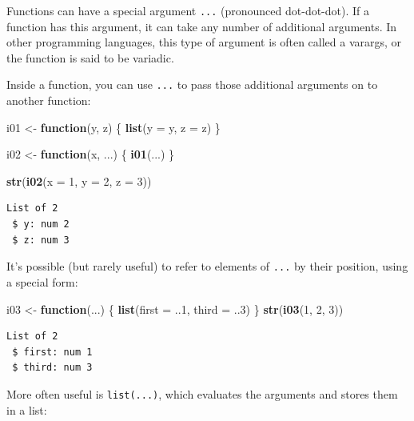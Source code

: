 \documentclass[]{book}
\newenvironment{Shaded}{\begin{snugshade}}{\end{snugshade}}
\newcommand{\ControlFlowTok}[1]{\textcolor[rgb]{0.13,0.29,0.53}{\textbf{#1}}}
\newcommand{\DataTypeTok}[1]{\textcolor[rgb]{0.13,0.29,0.53}{#1}}
\newcommand{\DecValTok}[1]{\textcolor[rgb]{0.00,0.00,0.81}{#1}}
\newcommand{\KeywordTok}[1]{\textcolor[rgb]{0.13,0.29,0.53}{\textbf{#1}}}
\newcommand{\NormalTok}[1]{#1}
\newcommand{\StringTok}[1]{\textcolor[rgb]{0.31,0.60,0.02}{#1}}
\theoremstyle{definition}
\theoremstyle{definition}
\theoremstyle{definition}
\theoremstyle{remark}
\begin{document}
Functions can have a special argument \texttt{...} (pronounced
dot-dot-dot). If a function has this argument, it can take any number of
additional arguments. In other programming languages, this type of
argument is often called a varargs, or the function is said to be
variadic.

Inside a function, you can use \texttt{...} to pass those additional
arguments on to another function:

\begin{Shaded}
\begin{Highlighting}[]
\NormalTok{i01 <-}\StringTok{ }\ControlFlowTok{function}\NormalTok{(y, z) \{}
  \KeywordTok{list}\NormalTok{(}\DataTypeTok{y =}\NormalTok{ y, }\DataTypeTok{z =}\NormalTok{ z)}
\NormalTok{\}}

\NormalTok{i02 <-}\StringTok{ }\ControlFlowTok{function}\NormalTok{(x, ...) \{}
  \KeywordTok{i01}\NormalTok{(...)}
\NormalTok{\}}

\KeywordTok{str}\NormalTok{(}\KeywordTok{i02}\NormalTok{(}\DataTypeTok{x =} \DecValTok{1}\NormalTok{, }\DataTypeTok{y =} \DecValTok{2}\NormalTok{, }\DataTypeTok{z =} \DecValTok{3}\NormalTok{))}
\end{Highlighting}
\end{Shaded}

\begin{verbatim}
List of 2
 $ y: num 2
 $ z: num 3
\end{verbatim}

It's possible (but rarely useful) to refer to elements of \texttt{...}
by their position, using a special form:

\begin{Shaded}
\begin{Highlighting}[]
\NormalTok{i03 <-}\StringTok{ }\ControlFlowTok{function}\NormalTok{(...) \{}
  \KeywordTok{list}\NormalTok{(}\DataTypeTok{first =}\NormalTok{ ..}\DecValTok{1}\NormalTok{, }\DataTypeTok{third =}\NormalTok{ ..}\DecValTok{3}\NormalTok{)}
\NormalTok{\}}
\KeywordTok{str}\NormalTok{(}\KeywordTok{i03}\NormalTok{(}\DecValTok{1}\NormalTok{, }\DecValTok{2}\NormalTok{, }\DecValTok{3}\NormalTok{))}
\end{Highlighting}
\end{Shaded}

\begin{verbatim}
List of 2
 $ first: num 1
 $ third: num 3
\end{verbatim}

More often useful is \texttt{list(...)}, which evaluates the arguments
and stores them in a list:
\end{document}
